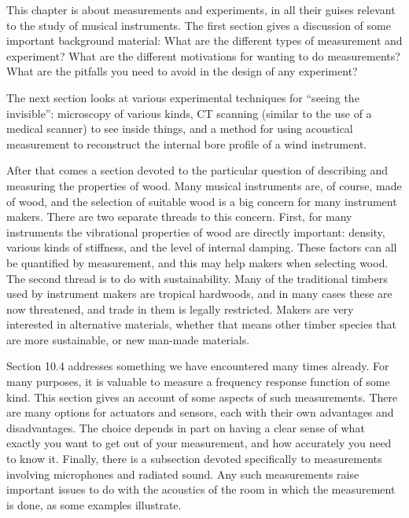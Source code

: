   This chapter is about measurements and experiments, in all their guises 
  relevant to the study of musical instruments. The first section gives a 
  discussion of some important background material: What are the different 
  types of measurement and experiment? What are the different motivations for 
  wanting to do measurements? What are the pitfalls you need to avoid in the 
  design of any experiment? 

  The next section looks at various experimental techniques for “seeing the 
  invisible”: microscopy of various kinds, CT scanning (similar to the use of a 
  medical scanner) to see inside things, and a method for using acoustical 
  measurement to reconstruct the internal bore profile of a wind instrument. 

  After that comes a section devoted to the particular question of describing 
  and measuring the properties of wood. Many musical instruments are, of 
  course, made of wood, and the selection of suitable wood is a big concern for 
  many instrument makers. There are two separate threads to this concern. 
  First, for many instruments the vibrational properties of wood are directly 
  important: density, various kinds of stiffness, and the level of internal 
  damping. These factors can all be quantified by measurement, and this may 
  help makers when selecting wood. The second thread is to do with 
  sustainability. Many of the traditional timbers used by instrument makers are 
  tropical hardwoods, and in many cases these are now threatened, and trade in 
  them is legally restricted. Makers are very interested in alternative 
  materials, whether that means other timber species that are more sustainable, 
  or new man-made materials. 

  Section 10.4 addresses something we have encountered many times already. For 
  many purposes, it is valuable to measure a frequency response function of 
  some kind. This section gives an account of some aspects of such 
  measurements. There are many options for actuators and sensors, each with 
  their own advantages and disadvantages. The choice depends in part on having 
  a clear sense of what exactly you want to get out of your measurement, and 
  how accurately you need to know it. Finally, there is a subsection devoted 
  specifically to measurements involving microphones and radiated sound. Any 
  such measurements raise important issues to do with the acoustics of the room 
  in which the measurement is done, as some examples illustrate. 

